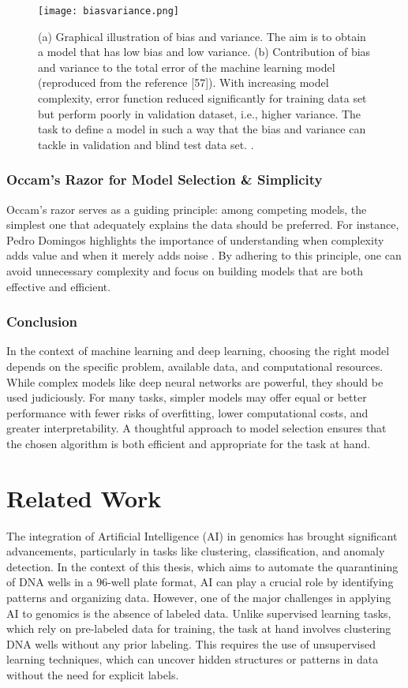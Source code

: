\begin{figure}[H]
    \centering
    \texttt{[image: biasvariance.png]}
    \caption{(a) Graphical illustration of bias and variance. The aim is to obtain a model that has low bias and low variance. (b) Contribution of bias and variance to the total error of the machine learning model (reproduced from the reference [57]). With increasing model complexity, error function reduced significantly for training data set but perform poorly in validation dataset, i.e., higher variance. The task to define a model in such a way that the bias and variance can tackle in validation and blind test data set. \cite{bias_variance_illustration}.}
    \label{fig:biasvariance}
    \end{figure}

\subsubsection{Occam's Razor for Model Selection \& Simplicity}
Occam's razor \cite{britannica_occams_razor} serves as a guiding principle: among competing models, the simplest one that adequately explains the data should be preferred. For instance, Pedro Domingos highlights the importance of understanding when complexity adds value and when it merely adds noise \cite{domingos2012few}.
By adhering to this principle, one can avoid unnecessary complexity and focus on building models that are both effective and efficient.

\subsubsection{Conclusion}

In the context of machine learning and deep learning, choosing the right model depends on the specific problem, available data, and computational resources. While complex models like deep neural networks are powerful, they should be used judiciously. For many tasks, simpler models may offer equal or better performance with fewer risks of overfitting, lower computational costs, and greater interpretability. A thoughtful approach to model selection ensures that the chosen algorithm is both efficient and appropriate for the task at hand.

\section{Related Work}
The integration of Artificial Intelligence (AI) in genomics has brought significant advancements, particularly in tasks like clustering, classification, and anomaly detection. In the context of this thesis, which aims to automate the quarantining of DNA wells in a 96-well plate format, AI can play a crucial role by identifying patterns and organizing data. However, one of the major challenges in applying AI to genomics is the absence of labeled data. Unlike supervised learning tasks, which rely on pre-labeled data for training, the task at hand involves clustering DNA wells without any prior labeling. This requires the use of unsupervised learning techniques, which can uncover hidden structures or patterns in data without the need for explicit labels.


